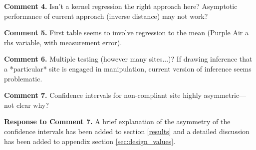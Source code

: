 \noindent\textbf{Comment 4.}  Isn't a kernel regression the right approach here?  Asymptotic performance of current approach (inverse distance) may not work?
   
\noindent\textbf{Comment 5.} First table seems to involve regression to the mean (Purple Air a rhs variable, with measurement error).
 
\noindent\textbf{Comment 6.} Multiple testing (however many sites...)?  If drawing inference that a *particular* site is engaged in manipulation, current version of inference seems problematic.

\noindent\textbf{Comment  7.} Confidence intervals for non-compliant site highly asymmetric---not clear why?

\noindent\textbf{Response to Comment 7.} A brief explanation of the asymmetry of the confidence intervals has been added to section \ref{results} and a detailed discussion has been added to appendix section \ref{sec:design_values}.
